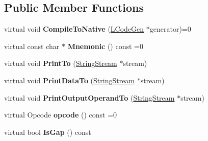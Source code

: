 \subsection*{Public Member Functions}
\begin{DoxyCompactItemize}
\item 
virtual void {\bfseries Compile\+To\+Native} (\hyperlink{classv8_1_1internal_1_1_l_code_gen}{L\+Code\+Gen} $\ast$generator)=0\hypertarget{classv8_1_1internal_1_1_l_instruction_acab3d83fd0de1d783ce5e5e8651009dd}{}\label{classv8_1_1internal_1_1_l_instruction_acab3d83fd0de1d783ce5e5e8651009dd}

\item 
virtual const char $\ast$ {\bfseries Mnemonic} () const  =0\hypertarget{classv8_1_1internal_1_1_l_instruction_ae256d0dcc2d6017d8c49d382254dccee}{}\label{classv8_1_1internal_1_1_l_instruction_ae256d0dcc2d6017d8c49d382254dccee}

\item 
virtual void {\bfseries Print\+To} (\hyperlink{classv8_1_1internal_1_1_string_stream}{String\+Stream} $\ast$stream)\hypertarget{classv8_1_1internal_1_1_l_instruction_a4b47b3f56cb9ff3917a50aa223a0b3ba}{}\label{classv8_1_1internal_1_1_l_instruction_a4b47b3f56cb9ff3917a50aa223a0b3ba}

\item 
virtual void {\bfseries Print\+Data\+To} (\hyperlink{classv8_1_1internal_1_1_string_stream}{String\+Stream} $\ast$stream)\hypertarget{classv8_1_1internal_1_1_l_instruction_a7df415abd239cd3e22963dee861268fe}{}\label{classv8_1_1internal_1_1_l_instruction_a7df415abd239cd3e22963dee861268fe}

\item 
virtual void {\bfseries Print\+Output\+Operand\+To} (\hyperlink{classv8_1_1internal_1_1_string_stream}{String\+Stream} $\ast$stream)\hypertarget{classv8_1_1internal_1_1_l_instruction_aa7d0d15728ddc21df5147309babff4a5}{}\label{classv8_1_1internal_1_1_l_instruction_aa7d0d15728ddc21df5147309babff4a5}

\item 
virtual Opcode {\bfseries opcode} () const  =0\hypertarget{classv8_1_1internal_1_1_l_instruction_aa0129e8a782b2dd3d9753986e3d245f1}{}\label{classv8_1_1internal_1_1_l_instruction_aa0129e8a782b2dd3d9753986e3d245f1}

\item 
virtual bool {\bfseries Is\+Gap} () const \hypertarget{classv8_1_1internal_1_1_l_instruction_a96115165585397545ac4945072c27dfc}{}\label{classv8_1_1internal_1_1_l_instruction_a96115165585397545ac4945072c27dfc}


\end{DoxyCompactItemize}
